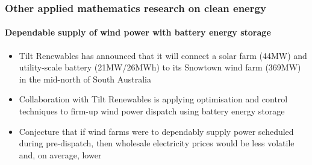 \documentclass[handout, smaller, xcolor=table]{beamer}			%
\begin{document}
\begin{frame}
	\frametitle{Other applied mathematics research on clean energy}
	\framesubtitle{Dependable supply of wind power with battery energy storage}
	
	\begin{minipage}{0.55\linewidth}
		\begin{itemize}
			\item  Tilt Renewables has announced that it will connect a solar farm (44MW) and utility-scale battery (21MW/26MWh) to its Snowtown wind farm (369MW) in the mid-north of South Australia
		
			\item  Collaboration with Tilt Renewables is applying optimisation and control techniques to firm-up wind power dispatch using battery energy storage
			
			\item  Conjecture that if wind farms were to dependably supply power scheduled during pre-dispatch, then wholesale electricity prices would be less volatile and, on average, lower 
	
		\end{itemize}
	\end{minipage}%
	\begin{minipage}{0.45\linewidth}
	\end{minipage}

	
\end{frame}


\end{document}
